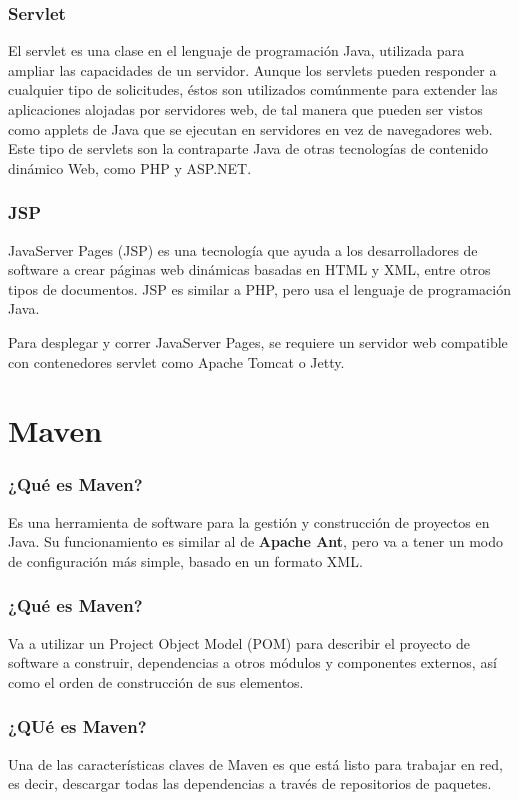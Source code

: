 \documentclass{beamer}
\begin{document}
\begin{frame}
  \frametitle{Servlet}
  El servlet es una clase en el lenguaje de programación Java,
  utilizada para ampliar las capacidades de un servidor. Aunque los
  servlets pueden responder a cualquier tipo de solicitudes, éstos son
  utilizados comúnmente para extender las aplicaciones alojadas por
  servidores web, de tal manera que pueden ser vistos como applets de
  Java que se ejecutan en servidores en vez de navegadores web. Este
  tipo de servlets son la contraparte Java de otras tecnologías de
  contenido dinámico Web, como PHP y ASP.NET.

\end{frame}

\begin{frame}
  \frametitle{JSP}
  JavaServer Pages (JSP) es una tecnología que ayuda a los
  desarrolladores de software a crear páginas web dinámicas basadas en
  HTML y XML, entre otros tipos de documentos. JSP es similar a PHP,
  pero usa el lenguaje de programación Java.

  Para desplegar y correr JavaServer Pages, se requiere un servidor web
  compatible con contenedores servlet como Apache Tomcat o Jetty.
\end{frame}

\section{Maven}

\begin{frame}
  \frametitle{¿Qué es Maven?}
  Es una herramienta de software para la gestión y construcción de
  proyectos en Java. Su funcionamiento es similar al de \textbf{Apache
    Ant}, pero va a tener un modo de configuración más simple, basado en
  un formato XML.
\end{frame}

\begin{frame}
  \frametitle{¿Qué es Maven?}
  Va a utilizar un Project Object Model (POM) para describir el proyecto
  de software a construir, dependencias a otros módulos y componentes
  externos, así como el orden de construcción de sus elementos.
\end{frame}

\begin{frame}
  \frametitle{¿QUé es Maven?}
  Una de las características claves de Maven es que está listo para
  trabajar en red, es decir, descargar todas las dependencias a través
  de repositorios de paquetes.
\end{frame}
\end{document}
